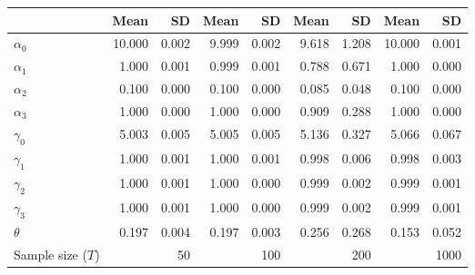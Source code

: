 
\begin{tabular}[t]{lrrrrrrrr}
\toprule
  & Mean & SD & Mean  & SD  & Mean   & SD   & Mean    & SD   \\
\midrule
$\alpha_{0}$ & 10.000 & 0.002 & 9.999 & 0.002 & 9.618 & 1.208 & 10.000 & 0.001\\
$\alpha_{1}$ & 1.000 & 0.001 & 0.999 & 0.001 & 0.788 & 0.671 & 1.000 & 0.000\\
$\alpha_{2}$ & 0.100 & 0.000 & 0.100 & 0.000 & 0.085 & 0.048 & 0.100 & 0.000\\
$\alpha_{3}$ & 1.000 & 0.000 & 1.000 & 0.000 & 0.909 & 0.288 & 1.000 & 0.000\\
$\gamma_{0}$ & 5.003 & 0.005 & 5.005 & 0.005 & 5.136 & 0.327 & 5.066 & 0.067\\
$\gamma_{1}$ & 1.000 & 0.001 & 1.000 & 0.001 & 0.998 & 0.006 & 0.998 & 0.003\\
$\gamma_{2}$ & 1.000 & 0.001 & 1.000 & 0.000 & 0.999 & 0.002 & 0.999 & 0.001\\
$\gamma_{3}$ & 1.000 & 0.001 & 1.000 & 0.000 & 0.999 & 0.002 & 0.999 & 0.001\\
$\theta$ & 0.197 & 0.004 & 0.197 & 0.003 & 0.256 & 0.268 & 0.153 & 0.052\\
Sample size ($T$) &  & 50 &  & 100 &  & 200 &  & 1000\\
\bottomrule
\end{tabular}
